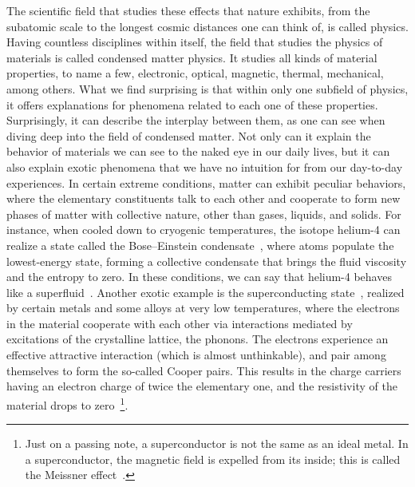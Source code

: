 The scientific field that studies these effects that nature exhibits, from the subatomic scale to the longest cosmic distances one can think of, is called physics.
Having countless disciplines within itself, the field that studies the physics of materials is called condensed matter physics.
It studies all kinds of material properties, to name a few, electronic, optical, magnetic, thermal, mechanical, among others.
What we find surprising is that within only one subfield of physics, it offers explanations for phenomena related to each one of these properties.
Surprisingly, it can describe the interplay between them, as one can see when diving deep into the field of condensed matter.
Not only can it explain the behavior of materials we can see to the naked eye in our daily lives, but it can also explain exotic phenomena that we have no intuition for from our day-to-day experiences.
In certain extreme conditions, matter can exhibit peculiar behaviors, where the elementary constituents talk to each other and cooperate to form new phases of matter with collective nature, other than gases, liquids, and solids.
For instance, when cooled down to cryogenic temperatures, the isotope helium-4 can realize a state called the Bose--Einstein condensate~\cite{PhysRev.54.947}, where atoms populate the lowest-energy state, forming a collective condensate that brings the fluid viscosity and the entropy to zero.
In these conditions, we can say that helium-4 behaves like a superfluid~\cite{Annett_2004,PhysRev.54.947}.
Another exotic example is the superconducting state~\cite{Onnes_1991}, realized by certain metals and some alloys at very low temperatures, where the electrons in the material cooperate with each other via interactions mediated by excitations of the crystalline lattice, the phonons.
The electrons experience an effective attractive interaction (which is almost unthinkable), and pair among themselves to form the so-called Cooper pairs.
This results in the charge carriers having an electron charge of twice the elementary one, and the resistivity of the material drops to zero~\cite{Onnes_1991,Annett_2004}\footnote{Just on a passing note, a superconductor is not the same as an ideal metal. In a superconductor, the magnetic field is expelled from its inside; this is called the Meissner effect~\cite{Meissner_Ochsenfeld_1933}.}.

